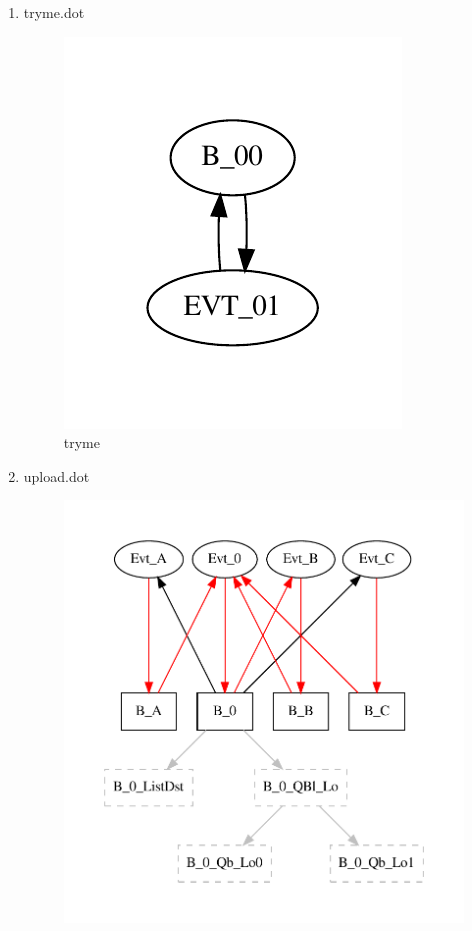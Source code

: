 \documentclass[12pt,a4paper]{report}
\begin{document}
\begin{enumerate}
\item tryme.dot
    \begin{figure}
        \centering 
        \includegraphics{TestPattern/tryme.pdf}
        \caption{tryme}
        \label{fig:tryme}
    \end{figure}
\item upload.dot
    \begin{figure}
        \centering 
        \includegraphics*[width=1.0\textwidth,keepaspectratio]{TestPattern/upload.pdf}

\end{figure}
\end{enumerate}
\end{document}
